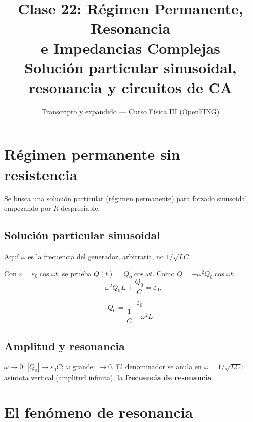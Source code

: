 \documentclass[12pt,a4paper]{article}
\title{\textbf{Clase 22: Régimen Permanente, Resonancia \\
        e Impedancias Complejas}\\[0.3em]
        \large{Solución particular sinusoidal, resonancia y circuitos de CA}}
\author{Transcripto y expandido --- Curso Física III (OpenFING)}
\date{}
\begin{document}
\maketitle
\thispagestyle{empty}
\newpage

\tableofcontents
\newpage

\section{Régimen permanente sin resistencia}

Se busca una solución particular (régimen permanente) para forzado sinusoidal,
empezando por $R$ despreciable.

\subsection{Solución particular sinusoidal}

\begin{warnbox}
  Aquí $\omega$ es la frecuencia del generador, arbitraria, no $1/\sqrt{LC}$.
\end{warnbox}

Con $\varepsilon = \varepsilon_0\cos\omega t$, se prueba $Q(t) = Q_0\cos\omega
t$. Como $\ddot Q = -\omega^2 Q_0\cos\omega t$:
\[
-\omega^2 Q_0 L + \frac{Q_0}{C} = \varepsilon_0.
\]

\begin{keybox}
  \[
  \boxed{Q_0 = \frac{\varepsilon_0}{\dfrac{1}{C} - \omega^2 L}}
  \]
\end{keybox}

\subsection{Amplitud y resonancia}

$\omega\to 0$: $|Q_0|\to\varepsilon_0 C$; $\omega$ grande: $\to 0$. El
denominador se anula en $\omega = 1/\sqrt{LC}$: asíntota vertical (amplitud
infinita), la \textbf{frecuencia de resonancia}.

\section{El fenómeno de resonancia}
\end{document}

